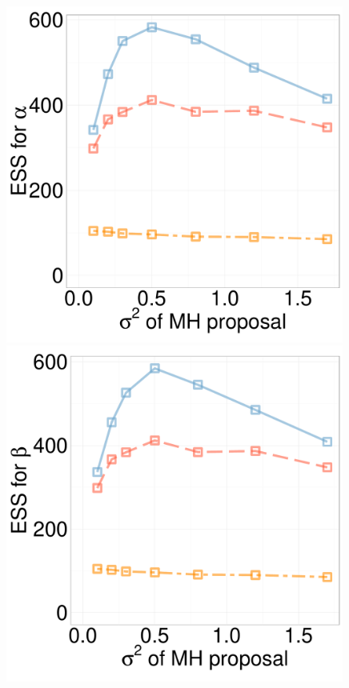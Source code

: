   \begin{figure}[H]
  \centering
  \begin{minipage}[!hp]{0.24\linewidth}
  \centering
    \includegraphics [width=0.99\textwidth, angle=0]{figs/ess/Q_D3alpha_k2.pdf}
\end{minipage}
  \begin{minipage}[hp]{0.24\linewidth}
  \centering
    \includegraphics [width=0.99\textwidth, angle=0]{figs/ess/Q_D3beta_k2.pdf}

\end{minipage}
\end{figure}
